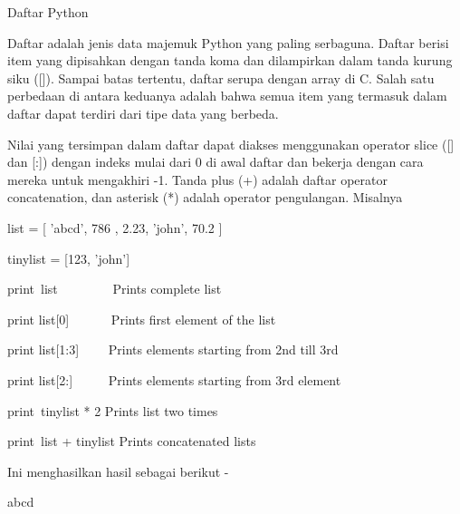 \noindent 
Daftar Python \par
\vspace{12pt}
\noindent 
Daftar adalah jenis data majemuk Python yang paling serbaguna. $  $Daftar berisi item yang dipisahkan dengan tanda koma dan dilampirkan dalam tanda kurung siku ([]). $  $Sampai batas tertentu, daftar serupa dengan array di C. Salah satu perbedaan di antara keduanya adalah bahwa semua item yang termasuk dalam daftar dapat terdiri dari tipe data yang berbeda. \par
\vspace{12pt}
\noindent 
Nilai yang tersimpan dalam daftar dapat diakses menggunakan operator slice ([] dan [:]) dengan indeks mulai dari 0 di awal daftar dan bekerja dengan cara mereka untuk mengakhiri -1. $  $Tanda plus (+) adalah daftar operator concatenation, dan asterisk (*) adalah operator pengulangan. $  $Misalnya  \par
\vspace{12pt}
\vspace{12pt}
\noindent 
list = [ 'abcd', 786 , 2.23, 'john', 70.2 ] \par
\noindent 
tinylist = [123, 'john'] \par
\vspace{12pt}
\noindent 
print~list~~~~~~~~   Prints complete list \par
\noindent 
print list[0]~~~~~~  Prints first element of the list \par
\noindent 
print list[1:3]~~~~  Prints elements starting from 2nd till 3rd  \par
\noindent 
print list[2:]~~~~~  Prints elements starting from 3rd element \par
\noindent 
print~tinylist * 2   Prints list two times \par
\noindent 
print~list + tinylist   Prints concatenated lists \par
\vspace{12pt}
\noindent 
Ini menghasilkan hasil sebagai berikut - \par
\vspace{12pt}
 \par
\noindent 
abcd \par
\noindent 
[786, 2.23] \par
\noindent 
[2.23, 'john', 70.200000000000003] \par
{} \par
{} \par
